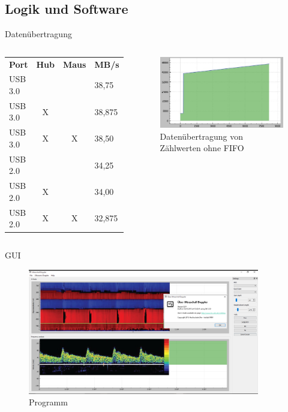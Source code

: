 \documentclass{beamer}
\begin{document}
\subsection{Logik und Software}
\begin{frame}{Datenübertragung}
\begin{columns}
	\begin{center}
    \setlength{\tabcolsep}{2pt}
    \small
    \begin{tabular}{l|c|c|l}
\textbf{Port} & \textbf{Hub} & \textbf{Maus} & \textbf{MB/s} \\
\cline{1-4}
USB 3.0 &  	&  	&	38,75	\\ 
USB 3.0 & X	&  	& 38,875	\\
USB 3.0 & X & X & 38,50	\\
\cline{1-4}
USB 2.0 &  	&  	& 34,25	\\
USB 2.0 & X &  	& 34,00	\\
USB 2.0 & X & X	& 32,875
\end{tabular}
  \end{center}%
		\begin{figure}[t]
			\includegraphics[width=\textwidth, trim= 0mm 0mm 0mm 0mm, clip=true]{images/vortrag/transfer-Counter1}
  			\caption{Datenübertragung von Zählwerten ohne FIFO}
		\end{figure}
	\end{columns}
\end{frame}
%
%
\begin{frame}{GUI}
  \begin{figure}[t]
	\includegraphics[width=0.9\textwidth, trim= 0mm 0mm 0mm 0mm, clip=true]{images/software/Programm}
  	\caption{Programm}
  \end{figure}
\end{frame}
\end{document}
